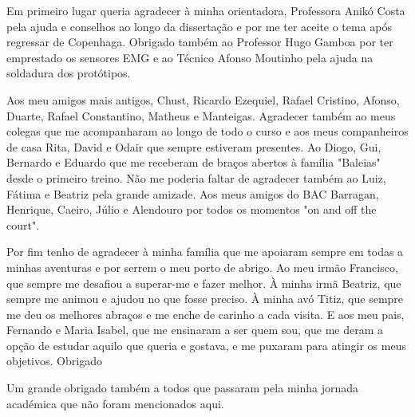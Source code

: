 
%

\begin{ntacknowledgements}

Em primeiro lugar queria agradecer à minha orientadora, Professora Anikó Costa pela ajuda e conselhos ao longo da dissertação e por me ter aceite o tema após regressar de Copenhaga. Obrigado também ao Professor Hugo 
Gamboa por ter emprestado os sensores EMG e ao Técnico Afonso Moutinho pela ajuda na soldadura dos protótipos.

Aos meu amigos mais antigos, Chust, Ricardo Ezequiel, Rafael Cristino, Afonso, Duarte, Rafael Constantino, Matheus e Manteigas.
Agradecer também ao meus colegas que me acompanharam ao longo de todo o curso e aos meus companheiros de casa Rita, David e Odair que sempre estiveram presentes. Ao Diogo, Gui, Bernardo e Eduardo que me receberam de 
braços abertos à família "Baleias" desde o primeiro treino. Não me poderia faltar de agradecer também ao Luiz, Fátima e Beatriz pela grande amizade. Aos meus amigos do BAC Barragan, Henrique, Caeiro, Júlio e Alendouro 
por todos os momentos "on and off the court".

Por fim tenho de agradecer à minha família que me apoiaram sempre em todas a minhas aventuras e por serrem o meu porto de abrigo. Ao meu irmão Francisco, que sempre me desafiou a superar-me e fazer melhor. À minha irmã Beatriz, que sempre me animou e 
ajudou no que fosse preciso. À minha avó Titiz, que sempre me deu os melhores abraços e me enche de carinho a cada visita. E aos meu pais, Fernando e Maria Isabel, que me ensinaram a ser quem sou, que me deram a opção 
de estudar aquilo que queria e gostava, e me puxaram para atingir os meus objetivos. Obrigado

Um grande obrigado também a todos que passaram pela minha jornada académica que não foram mencionados aqui.

\end{ntacknowledgements}